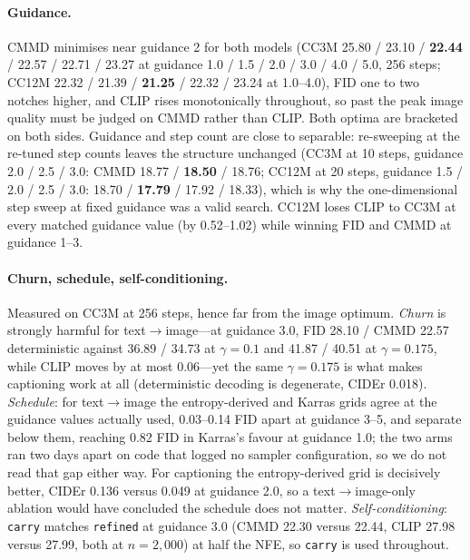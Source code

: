 \paragraph{Guidance.} CMMD minimises near guidance 2 for both models (CC3M 25.80 / 23.10 /
\textbf{22.44} / 22.57 / 22.71 / 23.27 at guidance 1.0 / 1.5 / 2.0 / 3.0 / 4.0 / 5.0, 256 steps;
CC12M 22.32 / 21.39 / \textbf{21.25} / 22.32 / 23.24 at 1.0--4.0), FID one to two notches higher,
and CLIP rises monotonically throughout, so past the peak image quality must be judged on CMMD
rather than CLIP. Both optima are bracketed on both sides. Guidance and step count are close to
separable: re-sweeping at the re-tuned step counts leaves the structure unchanged (CC3M at 10
steps, guidance 2.0 / 2.5 / 3.0: CMMD 18.77 / \textbf{18.50} / 18.76; CC12M at 20 steps, guidance
1.5 / 2.0 / 2.5 / 3.0: 18.70 / \textbf{17.79} / 17.92 / 18.33), which is why the one-dimensional
step sweep at fixed guidance was a valid search. CC12M loses CLIP to CC3M at every matched
guidance value (by 0.52--1.02) while winning FID and CMMD at guidance 1--3.

\paragraph{Churn, schedule, self-conditioning.} Measured on CC3M at 256 steps, hence far from the
image optimum. \emph{Churn} is strongly harmful for text$\rightarrow$image---at guidance 3.0, FID
28.10 / CMMD 22.57 deterministic against 36.89 / 34.73 at $\gamma{=}0.1$ and 41.87 / 40.51 at
$\gamma{=}0.175$, while CLIP moves by at most 0.06---yet the same $\gamma{=}0.175$ is what makes
captioning work at all (deterministic decoding is degenerate, CIDEr 0.018). \emph{Schedule}: for
text$\rightarrow$image the entropy-derived and Karras grids agree at the guidance values actually
used, 0.03--0.14 FID apart at guidance 3--5, and separate below them, reaching 0.82 FID in
Karras's favour at guidance 1.0; the two arms ran two days apart on code that logged no sampler
configuration, so we do not read that gap either way. For captioning the entropy-derived grid is
decisively better, CIDEr 0.136 versus 0.049 at guidance 2.0, so a text$\rightarrow$image-only
ablation would have concluded the schedule does not matter. \emph{Self-conditioning}:
\texttt{carry} matches \texttt{refined} at guidance 3.0 (CMMD 22.30 versus 22.44, CLIP 27.98
versus 27.99, both at $n{=}2{,}000$) at half the NFE, so \texttt{carry} is used throughout.

